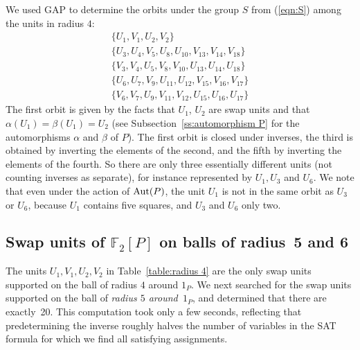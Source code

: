 \documentclass[11pt]{amsart}
\theoremstyle{mythm}
\theoremstyle{mydef}
\theoremstyle{myrem}
\numberwithin{equation}{section}
\newcommand{\Aut}{{\rm Aut}}
\begin{document}
  
  
  We used GAP to determine the orbits under the group $S$ from (\ref{eqn:S}) among the units in radius $4$:  
  \[
  \begin{array}{l}
  	\{U_1, V_1, U_2, V_2\} \\
  	\{U_3, U_4, V_5, U_8, U_{10}, V_{13}, V_{14}, V_{18}\} \\
  	\{V_3, V_4, U_5, V_8, V_{10}, U_{13}, U_{14}, U_{18}\} \\
  	\{U_6, U_7, V_9, U_{11}, U_{12}, V_{15}, V_{16}, V_{17}\} \\
  	\{V_6, V_7, U_9, V_{11}, V_{12}, U_{15}, U_{16}, U_{17}\}
  \end{array}
  \]
  The first orbit is given by the facts that $U_1$, $U_2$ are swap units and that    $\alpha(U_1) = \beta(U_1)= U_2$ (see Subsection~\ref{ss:automorphism P} for the automorphisms  $\alpha $ and $\beta$ of $P$).  The first orbit is closed under inverses, the third is obtained by  inverting the elements  of the second, and the fifth by  inverting the elements  of the fourth.   So there are only three essentially different units (not counting inverses as separate), for instance represented by $U_1, U_3$ and $U_6$. We note that  even under the action of $\Aut(P)$, the unit $U_1$ is not in the same orbit as $U_3$ or $U_6$, because $U_1$ contains five squares, and $U_3$ and $U_6 $ only two. 
  


    \subsection{Swap  units  of   $\mathbb{F}_2[P]$  on balls of radius~5 and 6}
 \label{ss:rad5and6}
The  units  $U_1,V_1,U_2,V_2$ in Table~\ref{table:radius 4} are the only swap units supported on the ball of  radius $4$ around $1_P$.   
We next searched for the swap units supported on the ball of \textit{radius $5$ around~$1_P$}, and determined that there are  exactly~20.  This computation took only a few  seconds, reflecting that predetermining the inverse roughly halves the number of variables in the SAT formula for which we find all satisfying assignments. 
\end{document}
